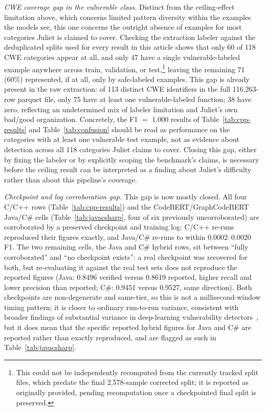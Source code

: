 \documentclass{ieeeaccess}
\begin{document}
\textit{CWE coverage gap in the vulnerable class.} Distinct from the ceiling-effect limitation above, which concerns limited pattern diversity within the examples the models see, this one concerns the outright absence of examples for most categories Juliet is claimed to cover. Checking the extraction labeler against the deduplicated splits used for every result in this article shows that only 60 of 118 CWE categories appear at all, and only 47 have a single vulnerable-labeled example anywhere across train, validation, or test,\footnote{This could not be independently recomputed from the currently tracked split files, which predate the final 2{,}578-sample corrected split; it is reported as originally provided, pending recomputation once a checkpointed final split is preserved.} leaving the remaining 71 (60\%) represented, if at all, only by safe-labeled examples. This gap is already present in the raw extraction: of 113 distinct CWE identifiers in the full 116{,}263-row parquet file, only 75 have at least one vulnerable-labeled function; 38 have zero, reflecting an undetermined mix of labeler limitation and Juliet's own bad/good organization. Concretely, the F1 $=$ 1.000 results of Table~\ref{tab:cpp-results} and Table~\ref{tab:confusion} should be read as performance on the categories with at least one vulnerable test example, not as evidence about detection across all 118 categories Juliet claims to cover. Closing this gap, either by fixing the labeler or by explicitly scoping the benchmark's claims, is necessary before the ceiling result can be interpreted as a finding about Juliet's difficulty rather than about this pipeline's coverage.

\textit{Checkpoint and log corroboration gap.} This gap is now mostly closed. All four C/C++ rows (Table~\ref{tab:cpp-results}) and the CodeBERT/GraphCodeBERT Java/C\# cells (Table~\ref{tab:javacsharp}, four of six previously uncorroborated) are corroborated by a preserved checkpoint and training log: C/C++ re-runs reproduced their figures exactly, and Java/C\# re-runs to within 0.0002--0.0020 F1. The two remaining cells, the Java and C\# hybrid rows, sit between ``fully corroborated'' and ``no checkpoint exists'': a real checkpoint was recovered for both, but re-evaluating it against the real test sets does not reproduce the reported figures (Java: 0.8496 verified versus 0.8619 reported, higher recall and lower precision than reported; C\#: 0.9451 versus 0.9527, same direction). Both checkpoints are non-degenerate and same-tier, so this is not a millisecond-window timing pattern; it is closer to ordinary run-to-run variance, consistent with broader findings of substantial variance in deep-learning vulnerability detectors~\cite{ref30}, but it does mean that the specific reported hybrid figures for Java and C\# are reported rather than exactly reproduced, and are flagged as such in Table~\ref{tab:javacsharp}.
\end{document}
